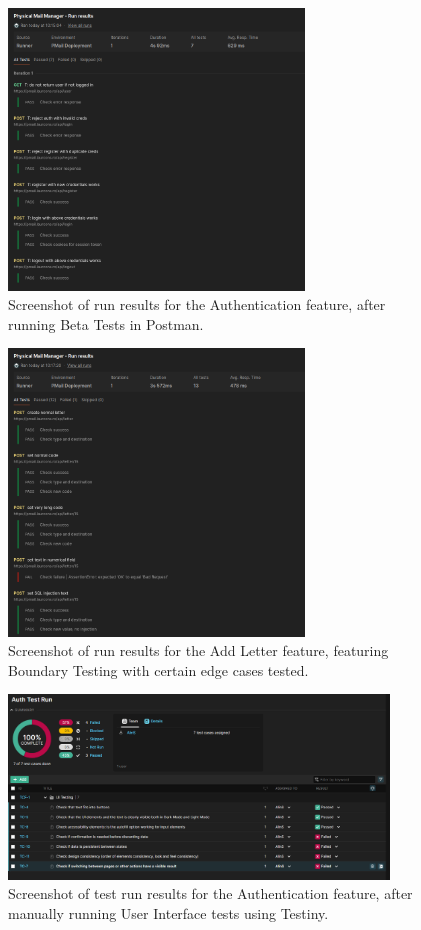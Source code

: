 \documentclass{article}
\begin{document}
\begin{figure}[htbp]
    \centering
    \includegraphics[width=0.7\textwidth]{./figures/postman-auth.png}
    \caption{Screenshot of run results for the Authentication feature, after running Beta Tests in Postman.}
    \label{FigReportPostmanAuth}
\end{figure}
\begin{figure}[htbp]
    \centering
    \includegraphics[width=0.7\textwidth]{./figures/postman-letters.png}
    \caption{Screenshot of run results for the Add Letter feature, featuring Boundary Testing with certain edge cases tested.}
    \label{FigReportPostmanLetters}
\end{figure}
\begin{figure}[htbp]
    \centering
    \includegraphics[width=0.9\textwidth]{./figures/testiny-auth.png}
    \caption{Screenshot of test run results for the Authentication feature, after manually running User Interface tests using Testiny.}
    \label{FigReportTestinyAuth}
\end{figure}
\end{document}
